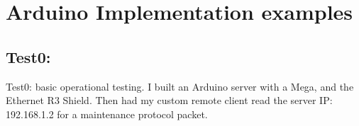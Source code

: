 \documentclass[12pt]{article}
\begin{document}

\section*{Arduino Implementation examples}
\subsection*{Test0:}
Test0: basic operational testing. I built an Arduino server with a Mega, and the Ethernet R3 Shield.
Then had my custom remote client read the server IP: 192.168.1.2  for a maintenance protocol packet.
\end{document}
